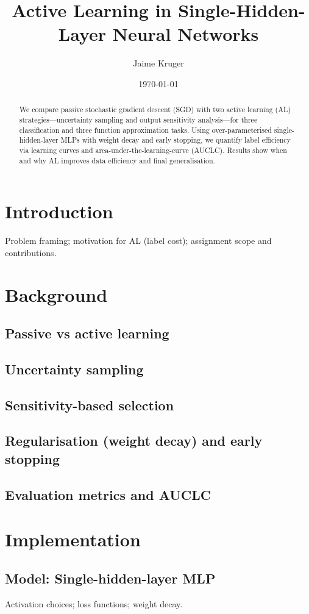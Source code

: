 \documentclass[11pt]{article}
\title{Active Learning in Single-Hidden-Layer Neural Networks}
\author{Jaime Kruger}
\date{\today}
\begin{document}
\maketitle

\begin{abstract}
We compare passive stochastic gradient descent (SGD) with two active learning (AL) strategies---uncertainty sampling and output sensitivity analysis---for three classification and three function approximation tasks. Using over-parameterised single-hidden-layer MLPs with weight decay and early stopping, we quantify label efficiency via learning curves and area-under-the-learning-curve (AUCLC). Results show when and why AL improves data efficiency and final generalisation.
\end{abstract}

\section{Introduction}
Problem framing; motivation for AL (label cost); assignment scope and contributions.

\section{Background}
\subsection{Passive vs active learning}
\subsection{Uncertainty sampling}
\subsection{Sensitivity-based selection}
\subsection{Regularisation (weight decay) and early stopping}
\subsection{Evaluation metrics and AUCLC}

\section{Implementation}
\subsection{Model: Single-hidden-layer MLP}
Activation choices; loss functions; weight decay.
\end{document}
